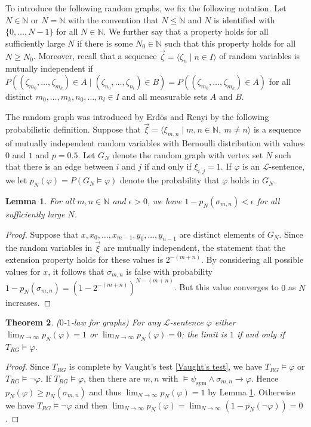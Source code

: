 \documentclass[10pt]{amsart}
\renewcommand{\L}{\mathcal{L}}
\newcommand{\NNN}{\mathbb{N}}
\newtheorem{theorem}{Theorem}[subsection]
\newtheorem{lemma}[theorem]{Lemma}
\theoremstyle{definition}
\theoremstyle{remark}
\begin{document}
To introduce the following random graphs, we fix the following notation. Let $N\in\NNN$ or $N=\NNN$ with the convention that $N\leq \NNN$ and $N$ is identified with $\{0,\dots,N-1\}$ for all $N\in\NNN$. We further say that a property holds for all sufficiently large $N$ if there is some $N_0\in\NNN$ such that this property holds for all $N\geq N_0$. Moreover, recall that a sequence $\vec{\zeta}=\langle\zeta_n\mid n\in I\rangle$ of random variables is mutually independent if $P((\zeta_{m_0},\dots,\zeta_{m_k})\in A\mid (\zeta_{n_0},\dots,\zeta_{n_l})\in B)=P((\zeta_{m_0},\dots,\zeta_{m_k})\in A)$ for all distinct $m_0,\dots,m_k,n_0,\dots,n_l\in I$ and all measurable sets $A$ and $B$. 

The random graph was introduced by Erd\"os and Renyi by the following probabilistic definition. Suppose that $\vec{\xi}=\langle \xi_{m,n}\mid m,n\in\NNN,\ m\neq n\rangle$ is a sequence of mutually independent random variables with Bernoulli distribution with values $0$ and $1$ and $p=0.5$. 
Let $G_N$ denote the random graph with vertex set $N$ such that there is an edge between $i$ and $j$ if and only if $\xi_{i,j}=1$. If $\varphi$ is an $\L$-sentence, we let $p_N(\varphi)=P(G_N\models \varphi)$ denote the probability that $\varphi$ holds in $G_N$. 

\begin{lemma} \label{inequality for random graphs} 
For all $m,n\in\NNN$ and $\epsilon>0$, we have 
$1-p_N(\sigma_{m,n})<\epsilon$ for all sufficiently large $N$. 
\end{lemma} 
\begin{proof} 
Suppose that $x,x_0,\dots,x_{m-1},y_0,\dots,y_{n-1}$ are distinct elements of $G_N$. Since the random variables in $\vec{\xi}$ are mutually independent, the statement that the extension property holds for these values is $2^{-(m+n)}$. By considering all possible values for $x$, it follows that $\sigma_{m,n}$ is false with probability $1-p_N(\sigma_{m,n})=(1-2^{-(m+n)})^{N-(m+n)}$. But this value converges to $0$ as $N$ increases. 
\end{proof} 

\begin{theorem} ($0$-$1$-law for graphs) 
For any $\L$-sentence $\varphi$ either $\lim_{N\rightarrow\infty} p_N(\varphi)=1$ or $\lim_{N\rightarrow\infty} p_N(\varphi)=0$; the limit is $1$ if and only if $T_{RG}\models\varphi$. 
\end{theorem} 
\begin{proof} 
Since $T_{RG}$ is complete by Vaught's test \ref{Vaught's test}, we have $T_{RG}\models \varphi$ or $T_{RG}\models \neg\varphi$. If $T_{RG}\models \varphi$, then there are $m,n$ with $\models \psi_{\mathrm{sym}}\wedge \sigma_{m,n} \rightarrow \varphi$. Hence $p_N(\varphi)\geq p_N(\sigma_{m,n})$ and thus $\lim_{N\rightarrow\infty} p_N(\varphi)=1$ by Lemma \ref{inequality for random graphs}. Otherwise we have $T_{RG}\models \neg\varphi$ and then $\lim_{N\rightarrow\infty} p_N(\varphi)=\lim_{N\rightarrow\infty} (1-p_N(\neg\varphi))=0$. 
\end{proof} 
\end{document}
